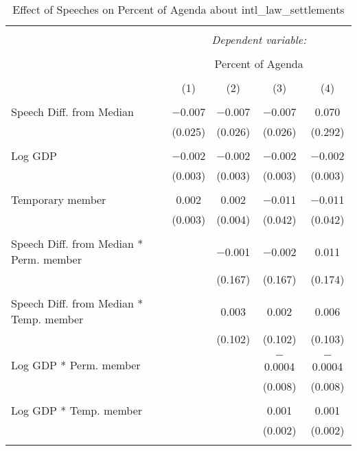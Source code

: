 
\begin{table}[!htbp] \centering 
  \caption{Effect of Speeches on Percent of Agenda about  intl_law_settlements} 
  \label{} 
\begin{tabular}{@{\extracolsep{5pt}}lcccc} 
\\[-1.8ex]\hline 
\hline \\[-1.8ex] 
 & \multicolumn{4}{c}{\textit{Dependent variable:}} \\ 
\cline{2-5} 
\\[-1.8ex] & \multicolumn{4}{c}{Percent of Agenda} \\ 
\\[-1.8ex] & (1) & (2) & (3) & (4)\\ 
\hline \\[-1.8ex] 
 Speech Diff. from Median & $-$0.007 & $-$0.007 & $-$0.007 & 0.070 \\ 
  & (0.025) & (0.026) & (0.026) & (0.292) \\ 
  & & & & \\ 
 Log GDP & $-$0.002 & $-$0.002 & $-$0.002 & $-$0.002 \\ 
  & (0.003) & (0.003) & (0.003) & (0.003) \\ 
  & & & & \\ 
 Temporary member & 0.002 & 0.002 & $-$0.011 & $-$0.011 \\ 
  & (0.003) & (0.004) & (0.042) & (0.042) \\ 
  & & & & \\ 
 Speech Diff. from Median * Perm. member &  & $-$0.001 & $-$0.002 & 0.011 \\ 
  &  & (0.167) & (0.167) & (0.174) \\ 
  & & & & \\ 
 Speech Diff. from Median * Temp. member &  & 0.003 & 0.002 & 0.006 \\ 
  &  & (0.102) & (0.102) & (0.103) \\ 
  & & & & \\ 
 Log GDP * Perm. member &  &  & $-$0.0004 & $-$0.0004 \\ 
  &  &  & (0.008) & (0.008) \\ 
  & & & & \\ 
 Log GDP * Temp. member &  &  & 0.001 & 0.001 \\ 
  &  &  & (0.002) & (0.002) \\ 
  & & & & \\ 

\end{tabular}
\end{table}
